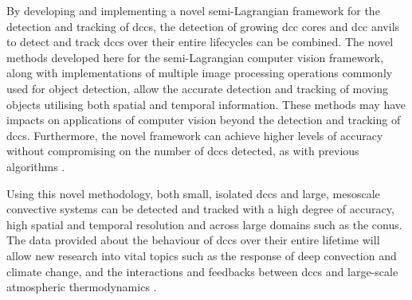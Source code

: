 By developing and implementing a novel semi-Lagrangian framework for the detection and tracking of \acrshort{dcc}s, the detection of growing \acrshort{dcc} cores \citep{zinner_cb-tram_2008} and \acrshort{dcc} anvils \citep{muller_role_2018} to detect and track \acrshort{dcc}s over their entire lifecycles can be combined.
The novel methods developed here for the semi-Lagrangian computer vision framework, along with implementations of multiple image processing operations commonly used for object detection, allow the accurate detection and tracking of moving objects utilising both spatial and temporal information.
These methods may have impacts on applications of computer vision beyond the detection and tracking of \acrshort{dcc}s.
Furthermore, the novel framework can achieve higher levels of accuracy without compromising on the number of \acrshort{dcc}s detected, as with previous algorithms \citep{muller_novel_2019}.

Using this novel methodology, both small, isolated \acrshort{dcc}s and large, mesoscale convective systems can be detected and tracked with a high degree of accuracy, high spatial and temporal resolution and across large domains such as the \acrshort{conus}.
The data provided about the behaviour of \acrshort{dcc}s over their entire lifetime will allow new research into vital topics such as the response of deep convection and climate change, and the interactions and feedbacks between \acrshort{dcc}s and large-scale atmospheric thermodynamics \citep{varble_erroneous_2018}.

